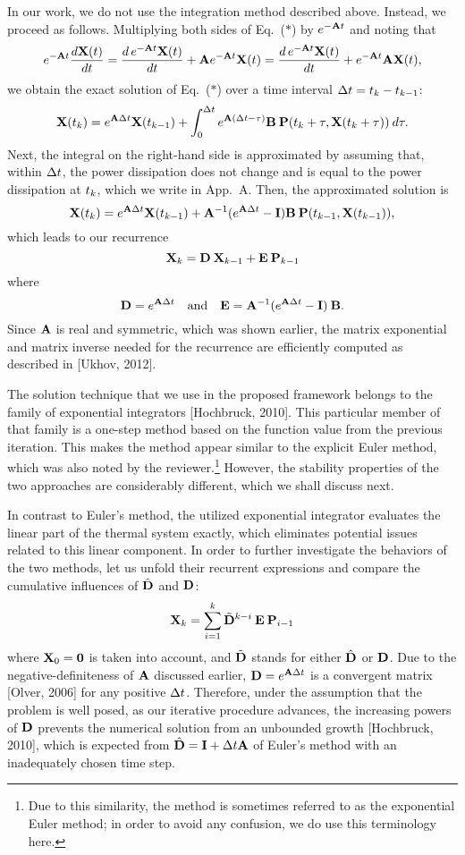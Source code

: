 \begin{authors}
In our work, we do not use the integration method described above.
Instead, we proceed as follows.
Multiplying both sides of Eq.~($\ast$) by $e^{- \mA \t}$ and noting that
\[
  e^{-\mA \t} \frac{d\vX(\t)}{d\t} = \frac{d\, e^{-\mA \t} \vX(\t)}{d\t} + \mA e^{-\mA \t} \vX(\t) = \frac{d\, e^{-\mA \t} \vX(\t)}{d\t} + e^{-\mA \t} \mA \vX(\t),
\]
we obtain the exact solution of Eq.~($\ast$) over a time interval $\Delta t = t_k - t_{k - 1}$:
\[
  \vX(\t_k) = e^{\mA \Delta \t} \vX(\t_{k - 1}) + \int_0^{\Delta \t} e^{\mA (\Delta t - \tau)} \mB \: \vP(\t_k + \tau, \vX(\t_k + \tau)) \: d\tau.
\]
Next, the integral on the right-hand side is approximated by assuming that, within $\Delta t$, the power dissipation does not change and is equal to the power dissipation at $t_k$, which we write in App.~A.
Then, the approximated solution is
\[
  \vX(\t_k) = e^{\mA \Delta \t} \vX(\t_{k - 1}) + \mA^{-1}(e^{\mA \Delta \t} - \mI) \mB \: \vP(\t_{k - 1}, \vX(\t_{k - 1})),
\]
which leads to our recurrence
\[
  \vX_k = \mCF \: \vX_{k - 1} + \mCS \: \vP_{k - 1}
\]
where
\[
  \mCF = e^{\mA \Delta t} \hspace{1em} \text{and} \hspace{1em} \mCS = \mA^{-1} (e^{\mA \Delta \t} - \mI) \: \mB.
\]
Since $\mA$ is real and symmetric, which was shown earlier, the matrix exponential and matrix inverse needed for the recurrence are efficiently computed as described in [Ukhov, 2012].

The solution technique that we use in the proposed framework belongs to the family of exponential integrators [Hochbruck, 2010].
This particular member of that family is a one-step method based on the function value from the previous iteration.
This makes the method appear similar to the explicit Euler method, which was also noted by the reviewer.\footnote{Due to this similarity, the method is sometimes referred to as the exponential Euler method; in order to avoid any confusion, we do use this terminology here.}
However, the stability properties of the two approaches are considerably different, which we shall discuss next.

In contrast to Euler's method, the utilized exponential integrator evaluates the linear part of the thermal system exactly, which eliminates potential issues related to this linear component.
In order to further investigate the behaviors of the two methods, let us unfold their recurrent expressions and compare the cumulative influences of $\hat{\mCF}$ and $\mCF$:
\[
  \vX_k = \sum_{i = 1}^k \tilde{\mCF}^{k - i} \: \mCS \: \vP_{i - 1}
\]
where $\vX_0 = \mZero$ is taken into account, and $\tilde{\mCF}$ stands for either $\hat{\mCF}$ or $\mCF$.
Due to the negative-definiteness of $\mA$ discussed earlier, $\mCF = e^{\mA \Delta \t}$ is a convergent matrix [Olver, 2006] for any positive $\Delta t$.
Therefore, under the assumption that the problem is well posed, as our iterative procedure advances, the increasing powers of $\mCF$ prevents the numerical solution from an unbounded growth [Hochbruck, 2010], which is expected from $\hat{\mCF} = \mI + \Delta \t \mA$ of Euler's method with an inadequately chosen time step.


\end{authors}
